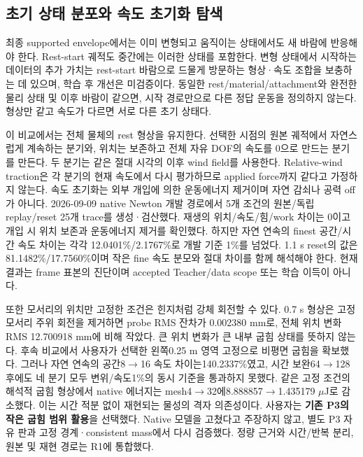 \documentclass[11pt]{article}
\begin{document}
\subsection{초기 상태 분포와 속도 초기화 탐색}
\label{sec:rd-initial-state-exploration}

최종 supported envelope에서는 이미 변형되고 움직이는 상태에서도 새 바람에 반응해야 한다.
Rest-start 궤적도 중간에는 이러한 상태를 포함한다. 변형 상태에서 시작하는 데이터의 추가 가치는
rest-start 바람으로 드물게 방문하는 형상·속도 조합을 보충하는 데 있으며, 학습 후 개선은 미검증이다.
동일한 rest/material/attachment와 완전한 물리 상태 및 이후 바람이 같으면, 시작 경로만으로 다른
정답 운동을 정의하지 않는다. 형상만 같고 속도가 다르면 서로 다른 초기 상태다.

이 비교에서는 전체 물체의 rest 형상을 유지한다. 선택한 시점의 원본 궤적에서
자연스럽게 계속하는 분기와, 위치는 보존하고 전체 자유 DOF의 속도를 0으로 만드는 분기를 만든다.
두 분기는 같은 절대 시각의 이후 wind field를 사용한다. Relative-wind traction은 각 분기의
현재 속도에서 다시 평가하므로 applied force까지 같다고 가정하지 않는다.
속도 초기화는 외부 개입에 의한 운동에너지 제거이며 자연 감쇠나 공력 off가 아니다.
2026-09-09 native Newton 개발 경로에서 5개 조건의 원본/독립 replay/reset 25개 trace를 생성·검산했다.
재생의 위치/속도/힘/work 차이는 0이고 개입 시 위치 보존과 운동에너지 제거를 확인했다.
하지만 자연 연속의 finest 공간/시간 속도 차이는 각각 12.0401\%/2.1767\%로 개발 기준 1\%를 넘었다.
1.1 s reset의 값은 81.1482\%/17.7560\%이며 작은 fine 속도 분모와 절대 차이를 함께 해석해야 한다.
현재 결과는 frame 표본의 진단이며 accepted Teacher/data scope 또는 학습 이득이 아니다.

또한 모서리의 위치만 고정한 조건은 힌지처럼 강체 회전할 수 있다.
0.7 s 형상은 고정 모서리 주위 회전을 제거하면 probe RMS 잔차가 0.002380 mm로,
전체 위치 변화 RMS 12.700918 mm에 비해 작았다. 큰 위치 변화가 큰 내부 굽힘 상태를 뜻하지 않는다.
후속 비교에서 사용자가 선택한 왼쪽0.25 m 영역 고정으로 비평면 굽힘을 확보했다.
그러나 자연 연속의 공간8$\to$16 속도 차이는140.2337\%였고, 시간 보완64$\to$128 후에도
네 분기 모두 변위/속도1\%의 동시 기준을 통과하지 못했다.
같은 고정 조건의 해석적 굽힘 형상에서 native 에너지는 mesh4$\to$32에8.888857$\to$1.435179 $\mu$J로 감소했다.
이는 시간 적분 없이 재현되는 물성의 격자 의존성이다. 사용자는 \textbf{기존 P3의 작은 굽힘 범위 활용}을 선택했다.
Native 모델을 고쳤다고 주장하지 않고, 별도 P3 자유 판과 고정 경계·consistent mass에서 다시 검증했다.
정량 근거와 시간/반복 분리, 원본 및 재현 경로는 R1에 통합했다.
\end{document}
